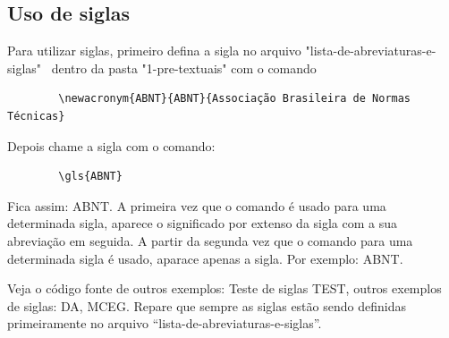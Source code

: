 \subsection{Uso de siglas} \label{sec:siglas}

    Para utilizar siglas, primeiro defina a sigla no arquivo "lista-de-abreviaturas-e-siglas"~ dentro da pasta "1-pre-textuais" com o comando 
    \begin{verbatim}
        \newacronym{ABNT}{ABNT}{Associação Brasileira de Normas Técnicas}
    \end{verbatim}
    Depois chame a sigla com o comando:
    \begin{verbatim}
        \gls{ABNT}
    \end{verbatim}
    Fica assim: \gls{ABNT}. A primeira vez que o comando é usado para uma determinada sigla, aparece o significado por extenso da sigla com a sua abreviação em seguida. A partir da segunda vez que o comando para uma determinada sigla é usado, aparace apenas a sigla. Por exemplo: \gls{ABNT}.  
    
    Veja o código fonte de outros exemplos: Teste de siglas \gls{TEST}, outros exemplos de siglas: \gls{DA}, \gls{MCEG}. 
    Repare que sempre as siglas estão sendo definidas primeiramente no arquivo ``lista-de-abreviaturas-e-siglas''.
\fi